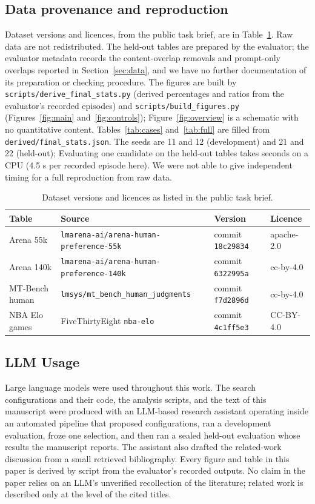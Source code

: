 \documentclass{article}
\begin{document}
\subsection{Data provenance and reproduction}
Dataset versions and licences, from the public task brief, are in Table~\ref{tab:prov}. Raw data are not redistributed. The held-out tables are prepared by the evaluator; the evaluator metadata records the content-overlap removals and prompt-only overlaps reported in Section~\ref{sec:data}, and we have no further documentation of its preparation or checking procedure. The figures are built by \texttt{scripts/derive\_final\_stats.py} (derived percentages and ratios from the evaluator's recorded episodes) and \texttt{scripts/build\_figures.py} (Figures~\ref{fig:main} and~\ref{fig:controls}); Figure~\ref{fig:overview} is a schematic with no quantitative content. Tables~\ref{tab:cases} and~\ref{tab:full} are filled from \texttt{derived/final\_stats.json}. The seeds are 11 and 12 (development) and 21 and 22 (held-out); Evaluating one candidate on the held-out tables takes seconds on a CPU (4.5 s per recorded episode here). We were not able to give independent timing for a full reproduction from raw data.

\begin{table}[h]
\centering
\caption{Dataset versions and licences as listed in the public task brief.}
\label{tab:prov}
\footnotesize
\begin{tabular}{llll}
\toprule
Table & Source & Version & Licence\\
\midrule
Arena 55k & \texttt{lmarena-ai/arena-human-preference-55k} & commit \texttt{18c29834} & apache-2.0\\
Arena 140k & \texttt{lmarena-ai/arena-human-preference-140k} & commit \texttt{6322995a} & cc-by-4.0\\
MT-Bench human & \texttt{lmsys/mt\_bench\_human\_judgments} & commit \texttt{f7d2896d} & cc-by-4.0\\
NBA Elo games & FiveThirtyEight \texttt{nba-elo} & commit \texttt{4c1ff5e3} & CC-BY-4.0\\
\bottomrule
\end{tabular}
\end{table}

\subsection{LLM Usage}
Large language models were used throughout this work. The search configurations and their code, the analysis scripts, and the text of this manuscript were produced with an LLM-based research assistant operating inside an automated pipeline that proposed configurations, ran a development evaluation, froze one selection, and then ran a sealed held-out evaluation whose results the manuscript reports. The assistant also drafted the related-work discussion from a small retrieved bibliography. Every figure and table in this paper is derived by script from the evaluator's recorded outputs. No claim in the paper relies on an LLM's unverified recollection of the literature; related work is described only at the level of the cited titles.
\end{document}
